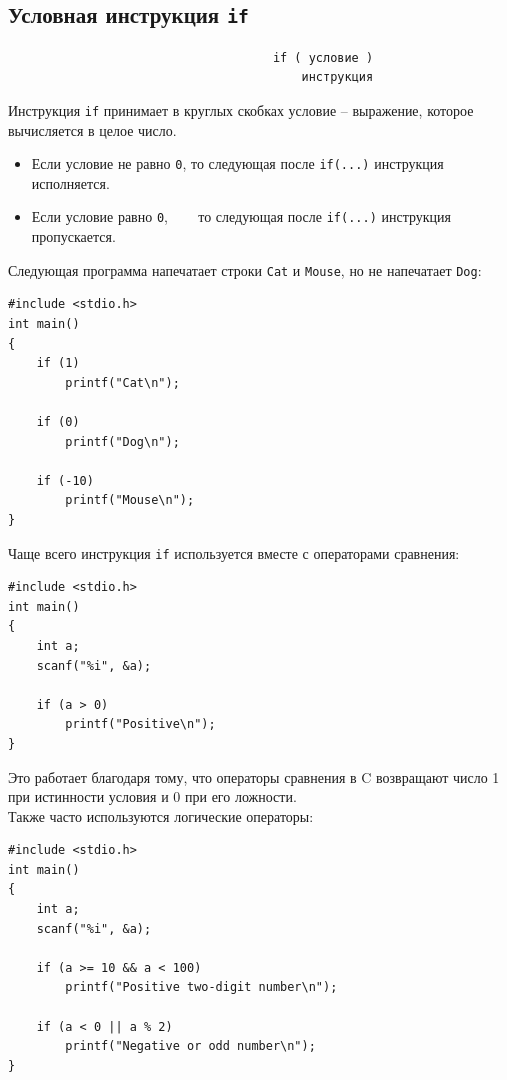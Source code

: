 \documentclass{article}
\begin{document}
\subsection*{Условная инструкция \texttt{if}}
\begin{lstlisting}
                                     if ( условие )
                                         инструкция
\end{lstlisting}
Инструкция \texttt{if} принимает в круглых скобках условие -- выражение, которое вычисляется в целое число. 
\begin{itemize}
\item Если условие не равно \texttt{0}, то следующая после \texttt{if(...)} инструкция исполняется.
\item Если условие равно \texttt{0}, ~~~ то следующая после \texttt{if(...)} инструкция пропускается.
\end{itemize}
Следующая программа напечатает строки \texttt{Cat} и \texttt{Mouse}, но не напечатает \texttt{Dog}:
\begin{lstlisting}
#include <stdio.h>
int main()
{
    if (1)
        printf("Cat\n");

    if (0)
        printf("Dog\n");
        
    if (-10)
        printf("Mouse\n");
}
\end{lstlisting}
Чаще всего инструкция \texttt{if} используется вместе с операторами сравнения:
\begin{lstlisting}
#include <stdio.h>
int main()
{
    int a;
    scanf("%i", &a);

    if (a > 0)
        printf("Positive\n");
}
\end{lstlisting}
Это работает благодаря тому, что операторы сравнения в C возвращают число 1 при истинности условия и 0 при его ложности.\\

\noindent Также часто используются логические операторы:
\begin{lstlisting}
#include <stdio.h>
int main()
{
    int a;
    scanf("%i", &a);

    if (a >= 10 && a < 100)
        printf("Positive two-digit number\n");
        
    if (a < 0 || a % 2)
        printf("Negative or odd number\n");
}
\end{lstlisting}
\end{document}
